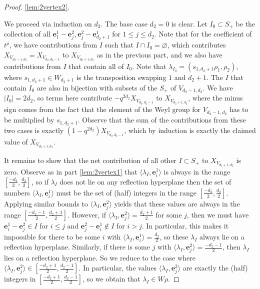 \documentclass[12pt]{article}
\renewcommand{\b}[1]{\textbf{#1}}
\theoremstyle{definition}
\theoremstyle{remark}
\begin{document}
\begin{proof}
    \ref{lem:2vertex2}.

    We proceed via induction on $d_2$. The base case $d_2=0$ is clear. Let $I_0\subset S_+$ be the collection of all $\b{e}_1^1-\b{e}_j^2,\b{e}_j^2-\b{e}_{d_2+1}^1$ for $1\leq j\leq d_2$. Note that for the coefficient of $t^\rho$, we have contributions from $I$ such that $I\cap I_0=\varnothing$, which contributes $X_{V_{d_2-1,d_2}}=X_{V_{d_2,d_2-1}}$ to $X_{V_{d_2+1,d_2}}$ as in the previous part, and we also have contributions from $I$ that contain all of $I_0$. Note that $\lambda_{I_0}=(s_{1,d_2+1}\rho_1,\rho_2)$, where $s_{1,d_2+1}\in W_{d_2+1}$ is the transposition swapping $1$ and $d_2+1$. The $I$ that contain $I_0$ are also in bijection with subsets of the $S_+$ of $V_{d_2-1,d_2}$. We have $|I_0|=2d_2$, so terms here contribute $-q^{2d_2}X_{V_{d_2,d_2-1}}$ to $X_{V_{d_2+1,d_2}}$, where the minus sign comes from the fact that the element of the Weyl group for $V_{d_2-1,d_2}$ has to be multiplied by $s_{1,d_2+1}$. Observe that the sum of the contributions from these two cases is exactly $(1-q^{2d_2})X_{V_{d_2,d_2-1}}$, which by induction is exactly the claimed value of $X_{V_{d_2+1,d_2}}$.

    It remains to show that the net contribution of all other $I\subset S_+$ to $X_{V_{d_2+1,d_2}}$ is zero. Observe as in part \ref{lem:2vertex1} that $\langle\lambda_I,\b{e}_i^1\rangle$ is always in the range $[\frac{-d_2}{2},\frac{d_2}{2}]$, so if $\lambda_I$ does not lie on any reflection hyperplane then the set of numbers $\langle\lambda_I,\b{e}_i^1\rangle$ must be the set of (half) integers in the range $[\frac{-d_2}{2},\frac{d_2}{2}]$. Applying similar bounds to $\langle\lambda_I,\b{e}_j^2\rangle$ yields that these values are always in the range $[\frac{-d_2-1}{2},\frac{d_2+1}{2}]$. However, if $\langle\lambda_I,\b{e}_j^2\rangle=\frac{d_2+1}{2}$ for some $j$, then we must have $\b{e}_i^1-\b{e}_j^2\in I$ for $i\leq j$ and $\b{e}_j^2-\b{e}_i^1\not\in I$ for $i>j$. In particular, this makes it impossible for there to be some $i$ with $\langle\lambda_I,\b{e}_i^1\rangle=\frac{d_2}{2}$, so these $\lambda_I$ always lie on a reflection hyperplane. Similarly, if there is some $j$ with $\langle\lambda_I,\b{e}_j^2\rangle=\frac{-d_2-1}{2}$, then $\lambda_I$ lies on a reflection hyperplane. So we reduce to the case where $\langle\lambda_I,\b{e}_j^2\rangle\in[\frac{-d_2+1}{2},\frac{d_2-1}{2}]$. In particular, the values $\langle\lambda_I,\b{e}_j^2\rangle$ are exactly the (half) integers in $[\frac{-d_2+1}{2},\frac{d_2-1}{2}]$, so we obtain that $\lambda_I\in W\rho$.


\end{proof}
\end{document}
